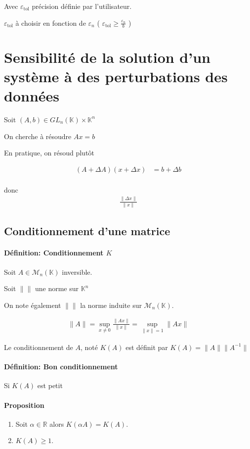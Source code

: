 \documentclass{article}
\newcommand{\cM}{\mathcal{M}}
\newcommand{\R}{\mathbb{R}}
\newcommand{\K}{\mathbb{K}}
\renewcommand{\epsilon}{\varepsilon}
\newenvironment{proposition}[1][\unskip]{
	\paragraph{Proposition #1}

}{}
\newenvironment{definition}[1][\unskip]{
	\paragraph{Définition: #1}

}{}
\begin{document}
\begin{example}
Avec $\epsilon_{\text{tol}}$ précision définie par l'utilisateur.

$\epsilon_\text{tol}$ à choisir en fonction de $\epsilon_n$ ( $\epsilon_\text{tol} \ge  \frac{\epsilon_n}{b}$ )


\section{Sensibilité de la solution d'un système à des perturbations des données}

Soit $(A, b) \in GL_n(\K)  \times \K^{n}$

On cherche à résoudre $Ax=b$ 

En pratique, on résoud plutôt

\begin{align*}
    (A + \Delta A)(x + \Delta x) &= b + \Delta b \\
\end{align*}

donc 
\begin{align*}
    \frac{\|\Delta x\|}{\|x\|}
\end{align*}

\subsection{Conditionnement d'une matrice}

\begin{definition}[Conditionnement $K$]
    Soit $A\in \cM_n(\K)$ inversible.

    Soit $\|\|$ une norme sur $\K^{n}$ 

On note également $\|\|$ la norme induite sur $\cM_n(\K)$.

\begin{align*}
    \|A\| = \sup_{x\neq 0} \frac{\|Ax\|}{\|x\|} = \sup_{\|x\|=1} \|Ax\|
\end{align*}

Le conditionnement de $A$, noté $K(A)$ est définit par $K(A) = \|A\| \|A^{-1}\|$

\end{definition}

\begin{definition}[Bon conditionnement]
   Si $K(A)$ est petit 
\end{definition}

\begin{proposition}
    \begin{enumerate}
        \item Soit $\alpha\in \R$ alors $K(\alpha A) = K(A)$.
        \item $K(A) \ge 1$.


\end{enumerate}
\end{proposition}
\end{example}
\end{document}
